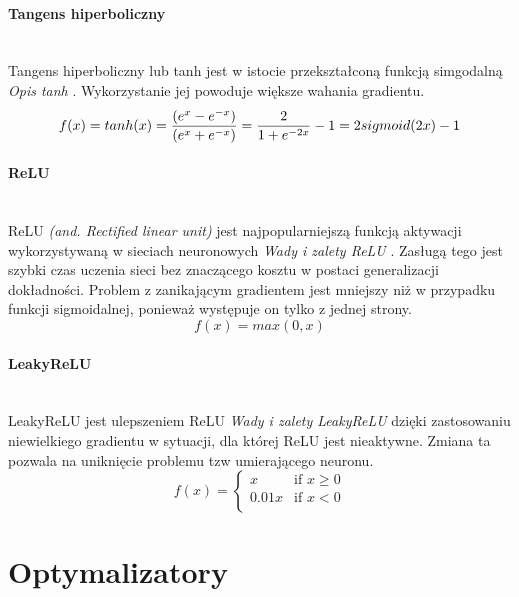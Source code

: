 \paragraph{Tangens hiperboliczny} \mbox{}\\
Tangens hiperboliczny lub tanh jest w istocie przekształconą funkcją simgodalną
\textit{Opis tanh} \cite{activationFunctions, activationFunctionsV2}. Wykorzystanie
jej powoduje większe wahania gradientu.
\begin{equation}
f(x) = tanh(x) = \frac{(e^x - e^{-x})}{(e^x + e^{-x})} = \frac{2}{1+e^{-2x}} - 1 = 2 sigmoid(2x) - 1\\
\end{equation}

\paragraph{ReLU} \mbox{}\\
ReLU \textit{(and. Rectified linear unit)} jest najpopularniejszą funkcją aktywacji
wykorzystywaną w sieciach neuronowych \textit{Wady i zalety ReLU} \cite{CS231n_activ, WIKIrectifier}.
Zasługą tego jest szybki czas uczenia sieci
bez znaczącego kosztu w postaci generalizacji dokładności. Problem z zanikającym
gradientem jest mniejszy niż w przypadku funkcji sigmoidalnej, ponieważ występuje
on tylko z jednej strony.
\begin{equation}
f(x) = max(0, x)
\end{equation}

\paragraph{LeakyReLU} \mbox{}\\
LeakyReLU jest ulepszeniem ReLU \textit{Wady i zalety LeakyReLU} \cite{CS231n_activ}
dzięki zastosowaniu niewielkiego gradientu w sytuacji, dla której ReLU jest nieaktywne. Zmiana ta pozwala na uniknięcie problemu tzw
umierającego neuronu.
\begin{equation}
f(x) =
\begin{cases}
x & \text{if } x \geqslant 0 \\
0.01x & \text{if } x < 0 \\
\end{cases}
\end{equation}

\section{Optymalizatory}
